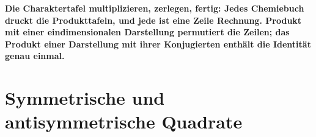 \begin{merksatz}
\begin{center}
\begin{minipage}{0.9\textwidth}
\textbf{Die Charaktertafel multiplizieren, zerlegen, fertig: Jedes Chemiebuch druckt die Produkttafeln, und jede ist eine Zeile Rechnung. Produkt mit einer eindimensionalen Darstellung permutiert die Zeilen; das Produkt einer Darstellung mit ihrer Konjugierten enthält die Identität genau einmal.}
\end{minipage}
\end{center}
\end{merksatz}

\section{Symmetrische und antisymmetrische Quadrate}

